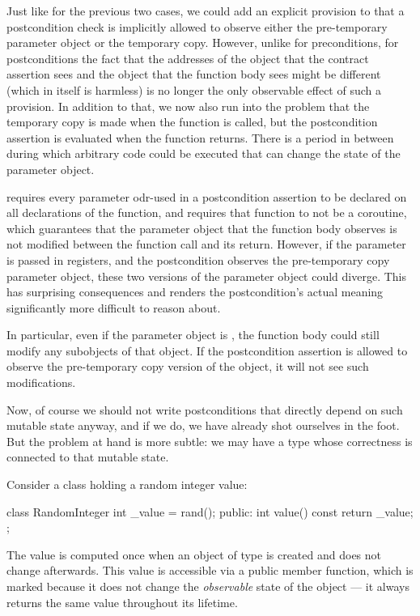 Just like for the previous two cases, we could add an explicit provision to \cite{P2900R10} that a postcondition check is implicitly allowed to observe either the pre-temporary parameter object or the temporary copy. However, unlike for preconditions, for postconditions the fact that the addresses of the object that the contract assertion sees and the object that the function body sees might be different (which in itself is harmless) is no longer the only observable effect of such a provision. In addition to that, we now also run into the problem that the temporary copy is made when the function is called, but the postcondition assertion is evaluated when the function returns. There is a period in between during which arbitrary code could be executed that can change the state of the parameter object.

\cite{P2900R10} requires every parameter odr-used in a postcondition assertion  to be declared  on all declarations of the function, and requires that function to not be a coroutine, which guarantees that the parameter object that the function body observes is not modified between the function call and its return. However, if the parameter is passed in registers, and the postcondition observes the pre-temporary copy parameter object, these two versions of the parameter object could diverge. This has surprising consequences and renders the postcondition's actual meaning significantly more difficult to reason about. 

In particular, even if the parameter object is , the function body could still modify any  subobjects of that object. If the postcondition assertion is allowed to observe the pre-temporary copy version of the object, it will not see such modifications.

Now, of course we should not write postconditions that directly depend on such mutable state anyway, and if we do, we have already shot ourselves in the foot. But the problem at hand is more subtle: we may have a type whose correctness is connected to that mutable state.

Consider a class  holding a random integer value:

\begin{codeblock}
class RandomInteger {
  int _value = rand();
public:
  int value() const { 
    return _value; 
  }
};
\end{codeblock}

The value is computed once when an object of type  is created and does not change afterwards. This value is accessible via a public  member function, which is marked  because it does not change the \emph{observable} state of the object --- it always returns the same value throughout its lifetime.

